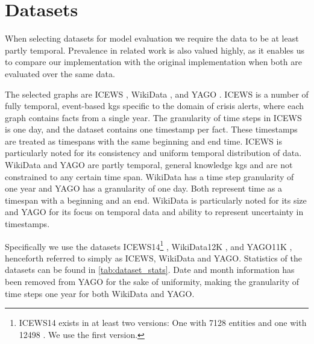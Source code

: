 \section{Datasets}
\label{sec:datasets}
When selecting datasets for model evaluation we require the data to be at least partly temporal. Prevalence in related work is also valued highly, as it enables us to compare our implementation with the original implementation when both are evaluated over the same data.



The selected graphs are ICEWS \cite{boschee2015ICEWS}, WikiData \cite{vrandecic2014wikidata}, and YAGO \cite{mahdisoltani2015YAGO3, tahon2020YAGO4}. 
ICEWS is a number of fully temporal, event-based \glspl{kg} specific to the domain of crisis alerts, where each graph contains facts from a single year.
The granularity of time steps in ICEWS is one day, and the dataset contains one timestamp per fact.
These timestamps are treated as timespans with the same beginning and end time.
ICEWS is particularly noted for its consistency and uniform temporal distribution of data. 
WikiData and YAGO are partly temporal, general knowledge \glspl{kg} and are not constrained to any certain time span.
WikiData has a time step granularity of one year and YAGO has a granularity of one day.
Both represent time as a timespan with a beginning and an end.
WikiData is particularly noted for its size and YAGO for its focus on temporal data and ability to represent uncertainty in timestamps.

Specifically we use the datasets \mbox{ICEWS14}\footnote{ICEWS14 exists in at least two versions: One with 7128 entities \cite{garcia-duran2018ta} and one with 12498 \cite{trivedi2017knowevolve}. We use the first version.}
, WikiData12K \cite{dasgupta2018hyte}, and YAGO11K \cite{dasgupta2018hyte}, henceforth referred to simply as ICEWS, WikiData and YAGO. Statistics of the datasets can be found in \autoref{tab:dataset_stats}. Date and month information has been removed from YAGO for the sake of uniformity, making the granularity of time steps one year for both WikiData and YAGO.